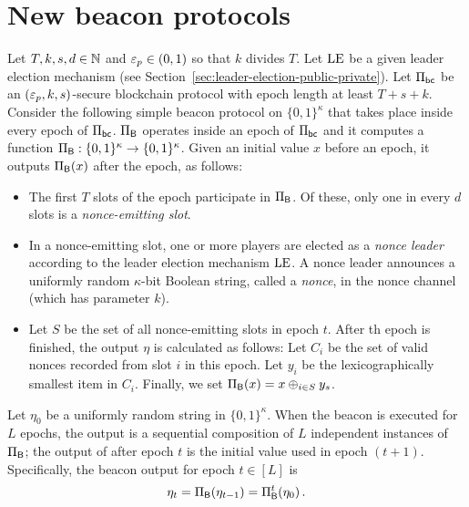 \newcommand{\PublicElectionDistribution}{\hat{\mathcal{L}}}
\newcommand{\PrivateElectionDistribution}{\mathcal{L}}

\section{New beacon protocols}




\begin{definition}
  Let $T, k, s,d \in \mathbb{N}$ and $\mathsf{\varepsilon}_p \in (0,1)$ 
  so that $k$ divides $T$.
  Let $\mathrm{LE}$ be a given leader election mechanism 
  (see Section~\ref{sec:leader-election-public-private}).
  Let $\Pi_\mathsf{bc}$ be an $(\mathsf{\varepsilon}_p, k, s)$-secure blockchain protocol 
  with epoch length at least $T + s + k$. 
  Consider the following simple beacon protocol on $\{0,1\}^\kappa$ 
  that takes place inside every epoch of $\Pi_\mathsf{bc}$. 
  $\Pi_{\mathsf{B}}$ operates inside an epoch of $\Pi_\mathsf{bc}$ 
  and it computes a function 
  $\Pi_{\mathsf{B}} : \{0,1\}^\kappa \rightarrow \{0,1\}^\kappa$. 
  Given an initial value $x$ before an epoch, 
  it outputs $\Pi_{\mathsf{B}}(x)$ 
  after the epoch, as follows:
  \begin{itemize}
    \item The first $T$ slots of the epoch participate in $\Pi_{\mathsf{B}}$. 
    Of these, only one in every $d$ slots is a \emph{nonce-emitting slot}. 

    \item In a nonce-emitting slot, one or more players are elected as a \emph{nonce leader} 
    according to the leader election mechanism $\mathrm{LE}$.
    A nonce leader announces a uniformly random $\kappa$-bit Boolean string, 
    called a \emph{nonce},  
    in the nonce channel (which has parameter $k$). 

    \item 
    Let $S$ be the set of all nonce-emitting slots in epoch $t$.
    After th epoch is finished, the output $\eta$ is calculated as follows:
    Let $C_i$ be the set of valid nonces recorded from slot $i$ in this epoch. 
    Let $y_i$ be the lexicographically smallest item in $C_i$.
    Finally, we set $\Pi_{\mathsf{B}}(x) = x \oplus_{i \in S} y_s$.
  \end{itemize}
  Let $\eta_0$ be a uniformly random string in $\{0,1\}^\kappa$. 
  When the beacon is executed for $L$ epochs, 
  the output is a sequential composition of 
  $L$ independent instances of $\Pi_{\mathsf{B}}$; 
  the output of after epoch $t$ is the initial value used in epoch $(t+1)$. 
  Specifically, 
  the beacon output for epoch $t \in [L]$ is 
  \begin{align}\label{eq:beacon-iterated}
    \eta_t = \Pi_{\mathsf{B}}(\eta_{t-1}) = \Pi_{\mathsf{B}}^t(\eta_0)\,.
  \end{align}
\end{definition}


